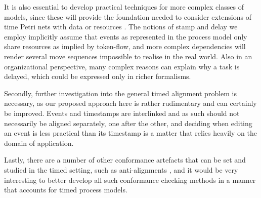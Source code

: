\documentclass[runningheads]{llncs}
\begin{document}
It is also essential to develop practical techniques for more complex classes of models, since these will provide the foundation needed to consider extensions of time Petri nets with data or resources \cite{Availability}. 
The notions of stamp and delay we employ implicitly assume that events as represented in the process model only share resources as implied by token-flow, and more complex dependencies will render several move sequences impossible to realise in the real world. \color{secondrevision}Also in an organizational perspective, many complex reasons can explain why a task is delayed, which could be expressed only in richer formalisms.\color{black}

Secondly, further investigation into the general timed alignment problem is necessary, as our proposed approach here is rather rudimentary and can certainly be improved.
Events and timestamps are interlinked and as such should not necessarily be aligned separately, one after the other, and deciding when editing an event is less practical than its timestamp is a matter that relies heavily on the domain of application. 



Lastly, there are a number of other conformance artefacts that can be set and studied in the timed setting, such as anti-alignments \cite{CBC21}, and it would be very interesting to better develop all such conformance checking methods in a manner that accounts for timed process models.
\color{black}

%
%
%


\end{document}
